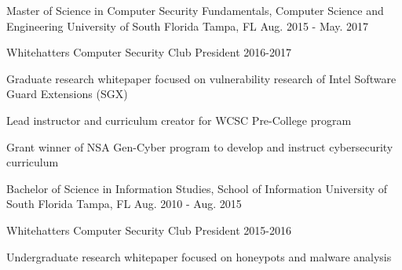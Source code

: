 \begin{cventries}

  \cventry
    {Master of Science in Computer Security Fundamentals, Computer Science and Engineering} %
    {University of South Florida} %
    {Tampa, FL} %
    {Aug. 2015 - May. 2017} %
    {
      \begin{cvitems} %
        \item {Whitehatters Computer Security Club President 2016-2017}
        \item {Graduate research whitepaper focused on vulnerability research of Intel Software Guard Extensions (SGX)}
        \item {Lead instructor and curriculum creator for WCSC Pre-College program}
        \item {Grant winner of NSA Gen-Cyber program to develop and instruct cybersecurity curriculum}
      \end{cvitems}
    }

\vspace{1em}

  \cventry
    {Bachelor of Science in Information Studies, School of Information} %
    {University of South Florida} %
    {Tampa, FL} %
    {Aug. 2010 - Aug. 2015} %
    {
      \begin{cvitems} %
        \item {Whitehatters Computer Security Club President 2015-2016}
        \item {Undergraduate research whitepaper focused on honeypots and malware analysis}
      \end{cvitems}
    }
\vspace{1em}
\end{cventries}
